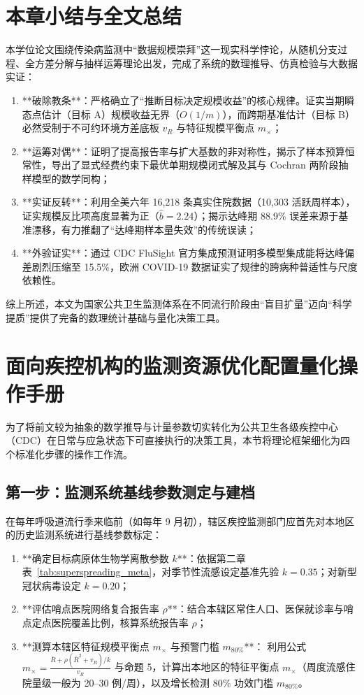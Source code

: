 \section{本章小结与全文总结}\label{sec:conclusion}

本学位论文围绕传染病监测中“数据规模崇拜”这一现实科学悖论，从随机分支过程、全方差分解与抽样运筹理论出发，完成了系统的数理推导、仿真检验与大数据实证：
\begin{enumerate}[label=(\arabic*)]
    \item **破除教条**：严格确立了“推断目标决定规模收益”的核心规律。证实当期瞬态点估计（目标 A）规模收益无界（$O(1/m)$），而跨期基准估计（目标 B）必然受制于不可约环境方差底板 $v_R$ 与特征规模平衡点 $m_\times$；
    \item **运筹对偶**：证明了提高报告率与扩大基数的非对称性，揭示了样本预算恒常性，导出了显式经费约束下最优单期规模闭式解及其与 Cochran 两阶段抽样模型的数学同构；
    \item **实证反转**：利用全美六年 16,218 条真实住院数据（10,303 活跃周样本），证实规模反比项高度显著为正（$\hat{b} = 2.24$）；揭示达峰期 88.9\% 误差来源于基准漂移，有力推翻了“达峰期样本量失效”的传统误读；
    \item **外验证实**：通过 CDC FluSight 官方集成预测证明多模型集成能将达峰偏差剧烈压缩至 15.5\%，欧洲 COVID-19 数据证实了规律的跨病种普适性与尺度依赖性。
\end{enumerate}

综上所述，本文为国家公共卫生监测体系在不同流行阶段由“盲目扩量”迈向“科学提质”提供了完备的数理统计基础与量化决策工具。


\section{面向疾控机构的监测资源优化配置量化操作手册}\label{sec:actionable_manual}

为了将前文较为抽象的数学推导与计量参数切实转化为公共卫生各级疾控中心（CDC）在日常与应急状态下可直接执行的决策工具，本节将理论框架细化为四个标准化步骤的操作工作流。

\subsection{第一步：监测系统基线参数测定与建档}
在每年呼吸道流行季来临前（如每年 9 月初），辖区疾控监测部门应首先对本地区的历史监测系统进行基线参数标定：
\begin{enumerate}[label=(\arabic*)]
    \item **确定目标病原体生物学离散参数 $k$**：依据第二章表~\ref{tab:superspreading_meta}，对季节性流感设定基准先验 $k = 0.35$；对新型冠状病毒设定 $k = 0.20$；
    \item **评估哨点医院网络复合报告率 $\rho$**：结合本辖区常住人口、医保就诊率与哨点定点医院覆盖比例，核算系统报告率 $\rho$；
    \item **测算本辖区特征规模平衡点 $m_\times$ 与预警门槛 $m_{80\%}$**：
    利用公式 $m_\times = \frac{\bar{R} + \rho(\bar{R}^2+v_R)/k}{v_R}$ 与命题 5，计算出本地区的特征平衡点 $m_\times$（周度流感住院量级一般为 20--30 例/周），以及增长检测 80\% 功效门槛 $m_{80\%}$。
\end{enumerate}

